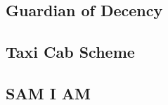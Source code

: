         \subsection{Guardian of Decency}
                
        \subsection{Taxi Cab Scheme}
                
        \subsection{SAM I AM}
                   